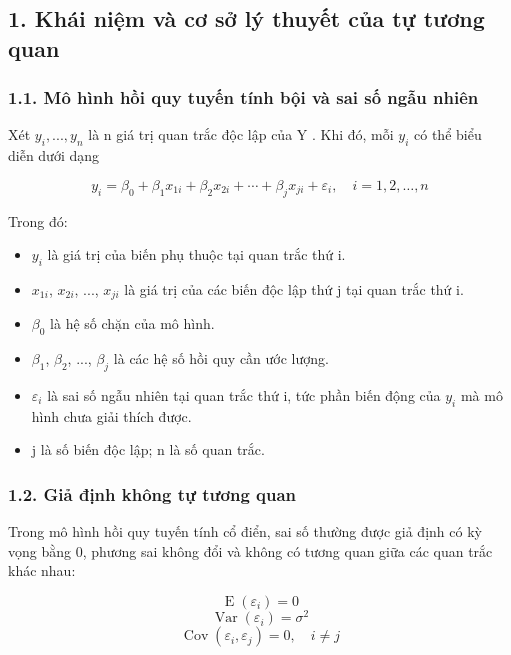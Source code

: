\subsection{1. Khái niệm và cơ sở lý thuyết của tự tương
quan}\label{khuxe1i-niux1ec7m-vuxe0-cux1a1-sux1edf-luxfd-thuyux1ebft-cux1ee7a-tux1ef1-tux1b0ux1a1ng-quan}

\subsubsection{1.1. Mô hình hồi quy tuyến tính bội và sai số ngẫu
nhiên}\label{nhux1eafc-lux1ea1i-muxf4-huxecnh-hux1ed3i-quy-tuyux1ebfn-tuxednh-bux1ed9i-vuxe0-sai-sux1ed1-ngux1eabu-nhiuxean}

Xét \(y_i , . . . , y_n\) là n giá trị quan trắc độc lập của Y . Khi đó, mỗi \(y_i\) có
thể biểu diễn dưới dạng

\[
y_i = \beta_0 + \beta_1x_{1i} + \beta_2x_{2i} + \cdots + \beta_jx_{ji} + \varepsilon_i,\quad i = 1,2,\ldots,n
\]

Trong đó:

\begin{itemize}
\item
  \(y_i\) là giá trị của biến phụ thuộc tại quan trắc thứ i.
\item
  \(x_{1i}\), \(x_{2i}\), ..., \(x_{ji}\) là giá trị của các biến độc lập thứ j tại quan trắc thứ
  i.
\item
  \(\beta_0\) là hệ số chặn của mô hình.
\item
  \(\beta_1\), \(\beta_2\), ..., \(\beta_j\) là các hệ số hồi quy cần ước lượng.
\item
  \(\varepsilon_i\) là sai số ngẫu nhiên tại quan trắc thứ i, tức phần biến động của \(y_i\)
  mà mô hình chưa giải thích được.
\item
  j là số biến độc lập; n là số quan trắc.
\end{itemize}

\subsubsection{1.2. Giả định không tự tương
quan}\label{giux1ea3-ux111ux1ecbnh-khuxf4ng-tux1ef1-tux1b0ux1a1ng-quan}

Trong mô hình hồi quy tuyến tính cổ điển, sai số thường được giả định có
kỳ vọng bằng 0, phương sai không đổi và không có tương quan giữa các
quan trắc khác nhau:

\[
\operatorname{E}(\varepsilon_i)=0
\]
\[
\operatorname{Var}(\varepsilon_i)=\sigma^2
\]
\[
\operatorname{Cov}(\varepsilon_i,\varepsilon_j)=0,\quad i\neq j
\]

